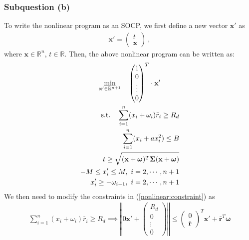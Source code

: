 \documentclass[12pt]{ftec2101}
\newcommand{\vect}[1]{\mathbf{#1}}
\begin{document}
\subsubsection{Subquestion (b)}
To write the nonlinear program as an SOCP, we first define a new vector $\vect{x'}$ as
\begin{align*}
    \vect{x'} = 
    \begin{pmatrix}
        t \\
        \vect{x}
    \end{pmatrix}\ , 
\end{align*}
where $\vect{x} \in \mathbb{R}^n$, $t \in \mathbb{R}$.
Then, the above nonlinear program can be written as:
\begin{gather}
    \min_{\vect{x'} \in \mathbb{R}^{n+1}} \quad
    \begin{pmatrix}
        1 \\
        0 \\
        \vdots \\
        0
    \end{pmatrix}^T
    \cdot \vect{x'}\\
\begin{aligned}
    \textup{s.t.} \quad \sum_{i=1}^{n} (x_i + \omega_i)\bar{r}_i \geq R_d \\
                        \sum_{i=1}^{n} (x_i + a x_i^2) \leq B \\
                        t \geq \sqrt{(\vect{x}+\boldsymbol{\omega})^T \boldsymbol{\Sigma} (\vect{x}+\boldsymbol{\omega})} \\
                        -M \leq x'_i \leq M,\ i=2,\cdots,n+1 \\
                        x'_i \geq - \omega_{i - 1},\ i=2,\cdots,n+1
\end{aligned}
\label{nonlinear:constraint}
\end{gather} 
We then need to modify the constraints in (\ref{nonlinear:constraint}) as
\begin{align}
    \sum_{i=1}^{n} (x_i + \omega_i)\bar{r}_i \geq R_d \implies \left \Vert 0 \vect{x'} + 
    \begin{pmatrix}
        R_d\\
        0\\
        \vdots\\
        0
    \end{pmatrix} \right \Vert \leq
    \begin{pmatrix}
        0\\
        \bar{\vect{r}}
    \end{pmatrix}^T \vect{x'} + \bar{\vect{r}}^T \boldsymbol{\omega}
\end{align}
\end{document}
